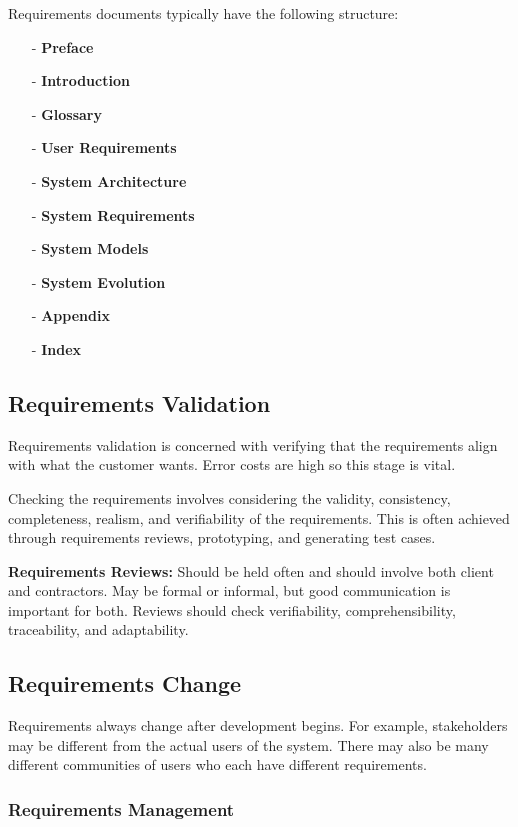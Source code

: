 \documentclass[12pt]{article}
\begin{document}
Requirements documents typically have the following structure:
\begin{itemize}
    \item [-] \textbf{Preface}
    \item [-] \textbf{Introduction}
    \item [-] \textbf{Glossary}
    \item [-] \textbf{User Requirements}
    \item [-] \textbf{System Architecture}
    \item [-] \textbf{System Requirements}
    \item [-] \textbf{System Models}
    \item [-] \textbf{System Evolution}
    \item [-] \textbf{Appendix}
    \item [-] \textbf{Index}
\end{itemize}

\subsection*{Requirements Validation}

Requirements validation is concerned with verifying that the requirements align with what the customer wants. Error costs are high so this stage is vital.

Checking the requirements involves considering the validity, consistency, completeness, realism, and verifiability of the requirements. This is often achieved through requirements reviews, prototyping, and generating test cases.

\textbf{Requirements Reviews:} Should be held often and should involve both client and contractors. May be formal or informal, but good communication is important for both. Reviews should check verifiability, comprehensibility, traceability, and adaptability.

\subsection*{Requirements Change}

Requirements always change after development begins. For example, stakeholders may be different from the actual users of the system. There may also be many different communities of users who each have different requirements.

\subsubsection*{Requirements Management}
\end{document}

